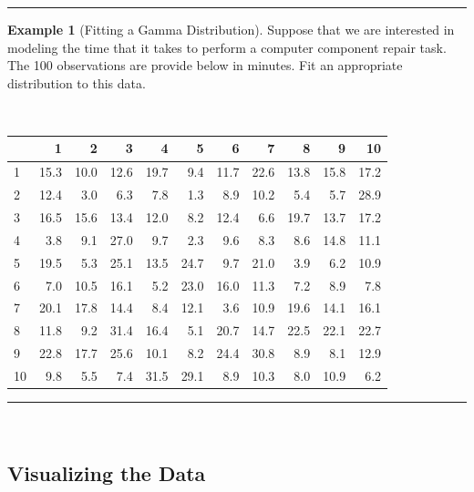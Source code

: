 \documentclass[
]{book}
\theoremstyle{definition}
\theoremstyle{definition}
\newtheorem{example}{Example}[chapter]
\theoremstyle{definition}
\theoremstyle{definition}
\theoremstyle{remark}
\begin{document}
\begin{center}\rule{0.5\linewidth}{0.5pt}\end{center}

\begin{example}[Fitting a Gamma Distribution]
\protect\hypertarget{exm:GammaFit}{}{\label{exm:GammaFit} {} }Suppose that we are
interested in modeling the time that it takes to perform a computer
component repair task. The 100 observations are provide below in
minutes. Fit an appropriate distribution to this data.
\end{example}
~

\begin{longtable}[]{@{}lrrrrrrrrrr@{}}
\toprule
& 1 & 2 & 3 & 4 & 5 & 6 & 7 & 8 & 9 & 10 \\
\midrule
\endhead
1 & 15.3 & 10.0 & 12.6 & 19.7 & 9.4 & 11.7 & 22.6 & 13.8 & 15.8 & 17.2 \\
2 & 12.4 & 3.0 & 6.3 & 7.8 & 1.3 & 8.9 & 10.2 & 5.4 & 5.7 & 28.9 \\
3 & 16.5 & 15.6 & 13.4 & 12.0 & 8.2 & 12.4 & 6.6 & 19.7 & 13.7 & 17.2 \\
4 & 3.8 & 9.1 & 27.0 & 9.7 & 2.3 & 9.6 & 8.3 & 8.6 & 14.8 & 11.1 \\
5 & 19.5 & 5.3 & 25.1 & 13.5 & 24.7 & 9.7 & 21.0 & 3.9 & 6.2 & 10.9 \\
6 & 7.0 & 10.5 & 16.1 & 5.2 & 23.0 & 16.0 & 11.3 & 7.2 & 8.9 & 7.8 \\
7 & 20.1 & 17.8 & 14.4 & 8.4 & 12.1 & 3.6 & 10.9 & 19.6 & 14.1 & 16.1 \\
8 & 11.8 & 9.2 & 31.4 & 16.4 & 5.1 & 20.7 & 14.7 & 22.5 & 22.1 & 22.7 \\
9 & 22.8 & 17.7 & 25.6 & 10.1 & 8.2 & 24.4 & 30.8 & 8.9 & 8.1 & 12.9 \\
10 & 9.8 & 5.5 & 7.4 & 31.5 & 29.1 & 8.9 & 10.3 & 8.0 & 10.9 & 6.2 \\
\bottomrule
\end{longtable}

\begin{center}\rule{0.5\linewidth}{0.5pt}\end{center}

~

\hypertarget{app:idm:subsec:visualizedata}{%
\subsection{Visualizing the Data}\label{app:idm:subsec:visualizedata}}
\end{document}
